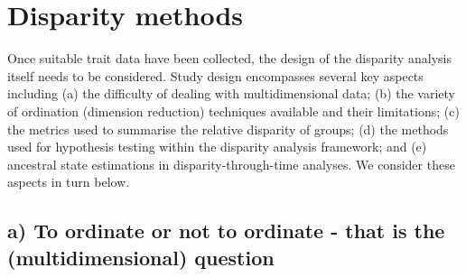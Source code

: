 \hypertarget{disparity-methods}{%
\section{Disparity methods}\label{disparity-methods}}

Once suitable trait data have been collected, the design of the
disparity analysis itself needs to be considered. Study design
encompasses several key aspects including (a) the difficulty of dealing
with multidimensional data; (b) the variety of ordination (dimension
reduction) techniques available and their limitations; (c) the metrics
used to summarise the relative disparity of groups; (d) the methods used
for hypothesis testing within the disparity analysis framework; and (e)
ancestral state estimations in disparity-through-time analyses. We
consider these aspects in turn below.
















\subsection{a) To ordinate or not to ordinate - that is the (multidimensional) question}

